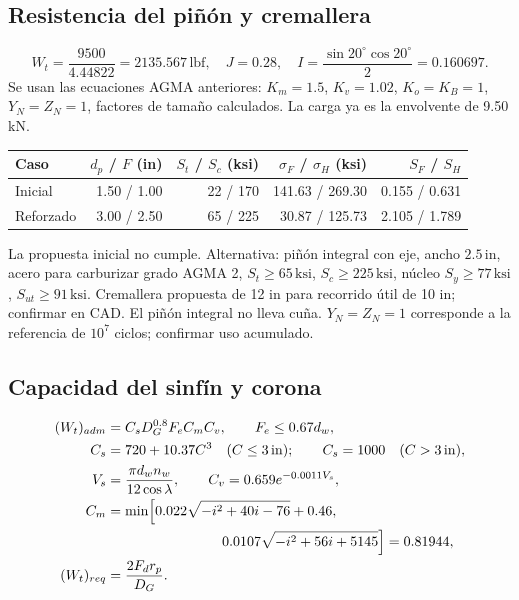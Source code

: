 \documentclass[11pt,a4paper]{article}
\newcommand{\inch}{\,\mathrm{in}}
\newcommand{\lbf}{\,\mathrm{lbf}}
\newcommand{\ksi}{\,\mathrm{ksi}}
\begin{document}
\subsection{Resistencia del piñón y cremallera}
\[
W_t=\frac{9500}{4.44822}=2135.567\lbf,\quad
J=0.28,\quad I=\frac{\sin20^\circ\cos20^\circ}{2}=0.160697.
\]
Se usan las ecuaciones AGMA anteriores: $K_m=1.5$, $K_v=1.02$, $K_o=K_B=1$, $Y_N=Z_N=1$, factores de tamaño calculados. La carga ya es la envolvente de 9.50 kN.

\begin{center}\small\begin{tabular}{lrrrr}\toprule

Caso & $d_p$ / $F$ (in) & $S_t$ / $S_c$ (ksi) & $\sigma_F$ / $\sigma_H$ (ksi) & $S_F$ / $S_H$ \\ \midrule

Inicial & 1.50 / 1.00 & 22 / 170 & 141.63 / 269.30 & 0.155 / 0.631 \\

Reforzado & 3.00 / 2.50 & 65 / 225 & 30.87 / 125.73 & 2.105 / 1.789 \\

\bottomrule\end{tabular}\end{center}

La propuesta inicial no cumple. Alternativa: piñón integral con eje, ancho $2.5\inch$, acero para carburizar grado AGMA 2, $S_t\geq65\ksi$, $S_c\geq225\ksi$, núcleo $S_y\geq77\ksi$, $S_{ut}\geq91\ksi$. Cremallera propuesta de 12 in para recorrido útil de 10 in; confirmar en CAD. El piñón integral no lleva cuña. $Y_N=Z_N=1$ corresponde a la referencia de $10^7$ ciclos; confirmar uso acumulado.

\subsection{Capacidad del sinfín y corona}
\begin{align*}
(W_t)_{adm}&=C_sD_G^{0.8}F_eC_mC_v,\qquad F_e\leq0.67d_w,\\
C_s&=720+10.37C^3\quad(C\leq3\inch);\qquad C_s=1000\quad(C>3\inch),\\
V_s&=\frac{\pi d_wn_w}{12\cos\lambda},\qquad
C_v=0.659e^{-0.0011V_s},\\
C_m&=\min\!\left[0.022\sqrt{-i^2+40i-76}+0.46,\right.\\
&\hspace{28mm}\left.0.0107\sqrt{-i^2+56i+5145}\right]=0.81944,\\
(W_t)_{req}&=\frac{2F_dr_p}{D_G}.
\end{align*}
\end{document}
